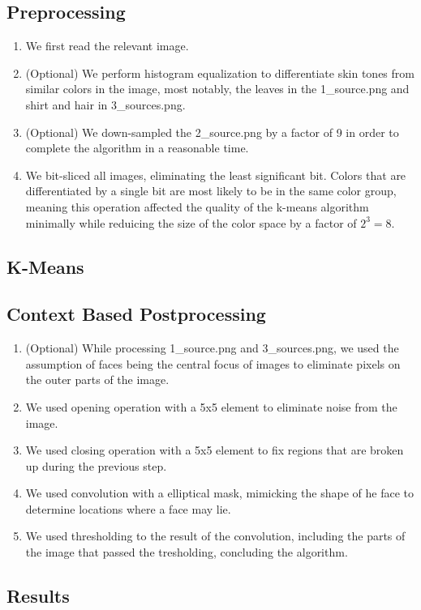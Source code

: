 \documentclass[conference]{IEEEtran}
\begin{document}
\subsection{Preprocessing}
\begin{enumerate}
	\item We first read the relevant image.
	\item (Optional) We perform histogram equalization to differentiate skin tones from similar colors in the image, most notably, the leaves in the 1\_source.png and shirt and hair in 3\_sources.png. 
	\item (Optional) We down-sampled the 2\_source.png by a factor of 9 in order to complete the algorithm in a reasonable time. 
	\item We bit-sliced all images, eliminating the least significant bit. Colors that are differentiated by a single bit are most likely to be in the same color group, meaning this operation affected the quality of the k-means algorithm minimally while reduicing the size of the color space by a factor of $2^3=8$.
\end{enumerate}
\subsection{K-Means}

\subsection{Context Based Postprocessing}
\begin{enumerate}
	\item (Optional) While processing 1\_source.png and 3\_sources.png, we used the assumption of faces being the central focus of images to eliminate pixels on the outer parts of the image.
	\item We used opening operation with a 5x5 element to eliminate noise from the image.
	\item We used closing operation with a 5x5 element to fix regions that are broken up during the previous step.
	\item We used convolution with a elliptical mask, mimicking the shape of he face to determine locations where a face may lie.
	\item We used thresholding to the result of the convolution, including the parts of the image that passed the tresholding, concluding the algorithm.
\end{enumerate}
\subsection{Results}
\end{document}
